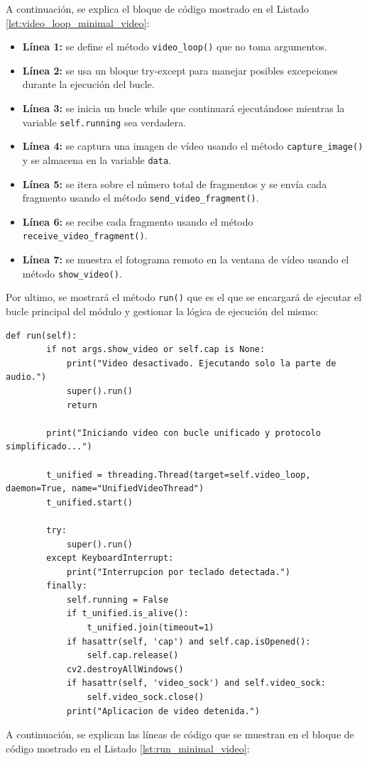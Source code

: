 \vspace{\baselineskip}
A continuación, se explica el bloque de código mostrado en el Listado \ref{lst:video_loop_minimal_video}:
\vspace{\baselineskip}
\begin{itemize}
    \item \textbf{Línea 1:} se define el método \texttt{video\_loop()} que no toma argumentos.
    \item \textbf{Línea 2:} se usa un bloque try-except para manejar posibles excepciones durante la ejecución del bucle.
    \item \textbf{Línea 3:} se inicia un bucle while que continuará ejecutándose mientras la variable \texttt{self.running} sea verdadera.
    \item \textbf{Línea 4:} se captura una imagen de vídeo usando el método \texttt{capture\_image()} y se almacena en la variable \texttt{data}.
    \item \textbf{Línea 5:} se itera sobre el número total de fragmentos y se envía cada fragmento usando el método \texttt{send\_video\_fragment()}.
    \item \textbf{Línea 6:} se recibe cada fragmento usando el método \texttt{receive\_video\_fragment()}.
    \item \textbf{Línea 7:} se muestra el fotograma remoto en la ventana de vídeo usando el método \texttt{show\_video()}.
\end{itemize}

\vspace{\baselineskip}

Por ultimo, se mostrará el método \texttt{run()} que es el que se encargará de ejecutar el bucle principal del módulo y gestionar la lógica de ejecución del mismo:
\begin{lstlisting}[style=pythonstyle, caption={Método \texttt{run()} de \textit{Minimal\_Video}.}, label={lst:run_minimal_video}]
def run(self):
        if not args.show_video or self.cap is None:
            print("Video desactivado. Ejecutando solo la parte de audio.")
            super().run()
            return

        print("Iniciando video con bucle unificado y protocolo simplificado...")

        t_unified = threading.Thread(target=self.video_loop, daemon=True, name="UnifiedVideoThread")
        t_unified.start()

        try:
            super().run()
        except KeyboardInterrupt:
            print("Interrupcion por teclado detectada.")
        finally:
            self.running = False
            if t_unified.is_alive():
                t_unified.join(timeout=1)
            if hasattr(self, 'cap') and self.cap.isOpened():
                self.cap.release()
            cv2.destroyAllWindows()
            if hasattr(self, 'video_sock') and self.video_sock:
                self.video_sock.close()
            print("Aplicacion de video detenida.")
\end{lstlisting}
\vspace{\baselineskip}
A continuación, se explican las líneas de código que se muestran en el bloque de código mostrado en el Listado \ref{lst:run_minimal_video}:

